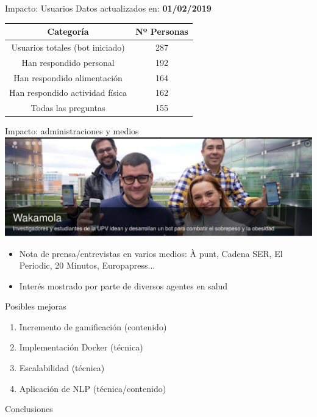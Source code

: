 \documentclass[bigger]{beamer}
\begin{document}
\begin{frame}{Impacto: Usuarios}
	Datos actualizados en: \textbf{01/02/2019}
	\centering
	\begin{tabular}{c | c}
		Categoría & Nº Personas\\
		\hline\hline
		Usuarios totales (bot iniciado) & 287\\
		Han respondido personal & 192\\
		Han respondido alimentación & 164\\
		Han respondido actividad física & 162\\
		Todas las preguntas & 155\\
		\hline\hline
		
	\end{tabular}
\end{frame}

\begin{frame}{Impacto: administraciones y medios}
	\centering
	\includegraphics[scale=0.3]{img/prensa}
	\begin{itemize}
		\item Nota de prensa/entrevistas en varios medios: À punt, Cadena SER, El Periodic, 20 Minutos, Europapress...
		\item Interés mostrado por parte de diversos agentes en salud
	\end{itemize}
\end{frame}

\begin{frame}{Posibles mejoras}
	\begin{enumerate}
		\item Incremento de gamificación (contenido)
		\item Implementación Docker (técnica)
		\item Escalabilidad (técnica)
		\item Aplicación de NLP (técnica/contenido)
	\end{enumerate}
\end{frame}

\begin{frame}{Conclusiones}
	
\end{frame}
\end{document}
